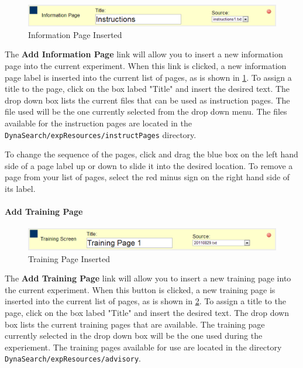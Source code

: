 \documentclass[article]{ij4uq}              %
\begin{document}
\begin{figure}[h!]
 \centering
 \includegraphics[width=5.0in]{figures/add_instruction.png}
 \caption{Information Page Inserted}
 \label{fig:infoInsert}
\end{figure}
\FloatBarrier

The \textbf{Add Information Page} link will allow you to insert a new information page into the current experiment. When this link is clicked, a new information page label is inserted into the current list of pages, as is shown in \ref{fig:infoInsert}.  To assign a title to the page, click on the box labed "Title" and insert the desired text.  The drop down box lists the current files that can be used as instruction pages.  The file used will be the one currently selected from the drop down menu.  The files available for the instruction pages are located in the \texttt{DynaSearch/expResources/instructPages} directory.

To change the sequence of the pages, click and drag the blue box on the left hand side of a page label up or down to slide it into the desired location. To remove a page from your list of pages, select the red minus sign on the right hand side of its label.

\paragraph{Add Training Page}

\begin{figure}[h!]
 \centering
 \includegraphics[width=5.0in]{figures/add_training.png}
 \caption{Training Page Inserted}
 \label{fig:trainInsert}
\end{figure}
\FloatBarrier

The \textbf{Add Training Page} link will allow you to insert a new training page into the current experiment. When this button is clicked, a new training page is inserted into the current list of pages, as is shown in \ref{fig:trainInsert}.  To assign a title to the page, click on the box labed "Title" and insert the desired text.  The drop down box lists the current training pages that are available.  The training page currently selected in the drop down box will be the one used during the experiement.  The training pages available for use are located in the  directory \texttt{DynaSearch/expResources/advisory}.
\end{document}
